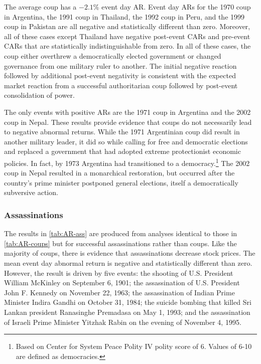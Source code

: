 \documentclass[12pt,final,fleqn]{article}
\theoremstyle{plain}
\begin{document}
The average coup has a $-2.1\%$ event day AR. Event day ARs for the 1970 coup in Argentina, the 1991 coup in Thailand, the 1992 coup in Peru, and the 1999 coup in Pakistan are all negative and statistically different than zero. Moreover, all of these cases except Thailand have negative post-event CARs and pre-event CARs that are statistically indistinguishable from zero. In all of these cases, the coup either overthrew a democratically elected government or changed governance from one military ruler to another. The initial negative reaction followed by additional post-event negativity is consistent with the expected market reaction from a successful authoritarian coup followed by post-event consolidation of power. 

The only events with positive ARs are the 1971 coup in Argentina and the 2002 coup in Nepal. These results provide evidence that coups do not necessarily lead to negative abnormal returns. While the 1971 Argentinian coup did result in another military leader, it did so while calling for free and democratic elections and replaced a government that had adopted extreme protectionist economic policies. In fact, by 1973 Argentina had transitioned to a democracy.\footnote{Based on Center for System Peace Polity IV polity score of 6. Values of 6-10 are defined as democracies.} The 2002 coup in Nepal resulted in a monarchical restoration, but occurred after the country's prime minister postponed general elections, itself a democratically subversive action.  

\subsubsection{Assassinations} \label{subsec: Assassinations}

The results in \autoref{tab:AR-ass} are produced from analyses identical to those in \autoref{tab:AR-coups} but for successful assassinations rather than coups. Like the majority of coups, there is evidence that assassinations decrease stock prices. The mean event day abnormal return is negative and statistically different than zero. However, the result is driven by five events: the shooting of U.S. President William McKinley on September 6, 1901; the assassination of U.S. President John F. Kennedy on November 22, 1963; the assassination of Indian Prime Minister Indira Gandhi on October 31, 1984; the suicide bombing that killed Sri Lankan president Ranasinghe Premadasa on May 1, 1993; and the assassination of Israeli Prime Minister Yitzhak Rabin on the evening of November 4, 1995.
\end{document}
